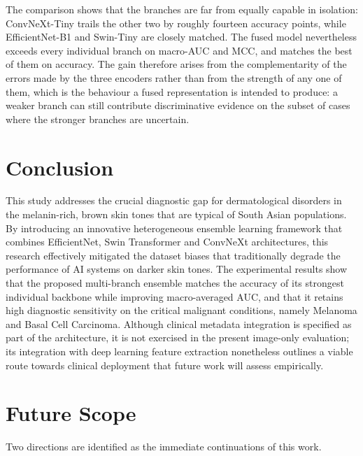 \documentclass[pdflatex,sn-mathphys-num]{sn-jnl}%
\begin{document}
The comparison shows that the branches are far from equally capable in isolation:
ConvNeXt-Tiny trails the other two by roughly fourteen accuracy points, while EfficientNet-B1
and Swin-Tiny are closely matched. The fused model nevertheless exceeds every individual
branch on macro-AUC and MCC, and matches the best of them on accuracy. The gain therefore
arises from the complementarity of the errors made by the three encoders rather than from the
strength of any one of them, which is the behaviour a fused representation is intended to
produce: a weaker branch can still contribute discriminative evidence on the subset of cases
where the stronger branches are uncertain.

\section{Conclusion}\label{sec:conclusion}

This study addresses the crucial diagnostic gap for dermatological disorders in the
melanin-rich, brown skin tones that are typical of South Asian populations. By introducing an
innovative heterogeneous ensemble learning framework that combines EfficientNet, Swin
Transformer and ConvNeXt architectures, this research effectively mitigated the dataset
biases that traditionally degrade the performance of AI systems on darker skin tones. The
experimental results show that the proposed multi-branch ensemble matches the accuracy of its
strongest individual backbone while improving macro-averaged AUC, and that it retains high
diagnostic sensitivity on the critical malignant conditions, namely Melanoma and Basal Cell
Carcinoma. Although clinical metadata integration is specified as part of the architecture, it
is not exercised in the present image-only evaluation; its integration with deep learning
feature extraction nonetheless outlines a viable route towards clinical deployment that future
work will assess empirically.

\section{Future Scope}\label{sec:future}

Two directions are identified as the immediate continuations of this work.
\end{document}

